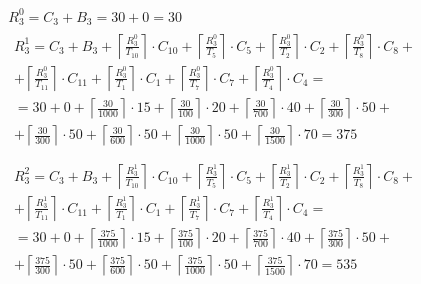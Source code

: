 \begin{gather*}
  R_3^0 = C_3 + B_3 = 30 + 0 = 30 \\
  \begin{multlined}
    R_3^1 = C_3 + B_3 + \left\lceil\frac{R_3^0}{T_{10}}\right\rceil\cdot C_{10} + %
    \left\lceil\frac{R_3^0}{T_5}\right\rceil\cdot C_5 + %
    \left\lceil\frac{R_3^0}{T_2}\right\rceil\cdot C_2 + %
    \left\lceil\frac{R_3^0}{T_8}\right\rceil\cdot C_8 + \\%
    + \left\lceil\frac{R_3^0}{T_{11}}\right\rceil\cdot C_{11} + %
    \left\lceil\frac{R_3^0}{T_1}\right\rceil\cdot C_1 +%
    \left\lceil\frac{R_3^0}{T_7}\right\rceil\cdot C_7 +%
    \left\lceil\frac{R_3^0}{T_4}\right\rceil\cdot C_4 = \\%
    = 30 + 0 + \left\lceil\frac{30}{1000}\right\rceil\cdot 15 + %
    \left\lceil\frac{30}{100}\right\rceil\cdot 20 + %
    \left\lceil\frac{30}{700}\right\rceil\cdot 40 + %
    \left\lceil\frac{30}{300}\right\rceil\cdot 50 + \\%
    + \left\lceil\frac{30}{300}\right\rceil\cdot 50 + %
    \left\lceil\frac{30}{600}\right\rceil\cdot 50 + %
    \left\lceil\frac{30}{1000}\right\rceil\cdot 50 +%
    \left\lceil\frac{30}{1500}\right\rceil\cdot 70 = 375 \\
  \end{multlined} \\
  \begin{multlined}
    R_3^2 = C_3 + B_3 + \left\lceil\frac{R_3^1}{T_{10}}\right\rceil\cdot C_{10} + %
    \left\lceil\frac{R_3^1}{T_5}\right\rceil\cdot C_5 + %
    \left\lceil\frac{R_3^1}{T_2}\right\rceil\cdot C_2 + %
    \left\lceil\frac{R_3^1}{T_8}\right\rceil\cdot C_8 + \\%
    + \left\lceil\frac{R_3^1}{T_{11}}\right\rceil\cdot C_{11} + %
    \left\lceil\frac{R_3^1}{T_1}\right\rceil\cdot C_1 +%
    \left\lceil\frac{R_3^1}{T_7}\right\rceil\cdot C_7 +%
    \left\lceil\frac{R_3^1}{T_4}\right\rceil\cdot C_4 = \\%
    = 30 + 0 + \left\lceil\frac{375}{1000}\right\rceil\cdot 15 + %
    \left\lceil\frac{375}{100}\right\rceil\cdot 20 + %
    \left\lceil\frac{375}{700}\right\rceil\cdot 40 + %
    \left\lceil\frac{375}{300}\right\rceil\cdot 50 + \\%
    + \left\lceil\frac{375}{300}\right\rceil\cdot 50 + %
    \left\lceil\frac{375}{600}\right\rceil\cdot 50 + %
    \left\lceil\frac{375}{1000}\right\rceil\cdot 50 +%
    \left\lceil\frac{375}{1500}\right\rceil\cdot 70 = 535 \\
  \end{multlined} \\

\end{gather*}

